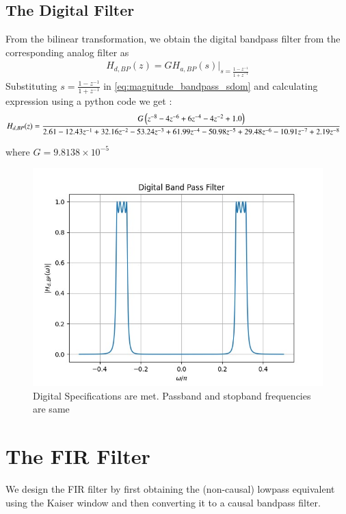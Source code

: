 \documentclass{article}
\begin{document}
\subsection{The Digital Filter}
From the bilinear transformation, we obtain the digital bandpass filter from the corresponding analog filter as
\begin{align}
    H_{d,BP}(z) = GH_{a,BP}(s)\vert_{s = \frac{1-z^{-1}}{1 + z^{-1}}}
\end{align}
Substituting $s=\frac{1-z^{-1}}{1+z^{-1}}$ in \eqref{eq:magnitude_bandpass_sdom} and calculating expression using a python code we get :
\begin{align}
    H_{d,BP}(z) &= \frac{G\left(z^{-8} - 4z^{-6} + 6z^{-4} - 4z^{-2} + 1.0\right)}{2.61 - 12.43z^{-1} + 32.16z^{-2} - 53.24z^{-3} + 61.99z^{-4} - 50.98z^{-5} + 29.48z^{-6} - 10.91z^{-7} + 2.19z^{-8}}
\end{align}

where $G=9.8138\times 10^{-5}$    
\begin{figure}[H]
\centering
\includegraphics[width=1\columnwidth]{figs/dig_bpfilt.png}
\caption{Digital Specifications are met. Passband and stopband frequencies are same}
\label{fig:Digital_BPF}
\end{figure}

\section{The FIR Filter}
We design the FIR filter by first obtaining the (non-causal) lowpass equivalent using the Kaiser window
and then
converting it to a causal bandpass filter.
\end{document}

